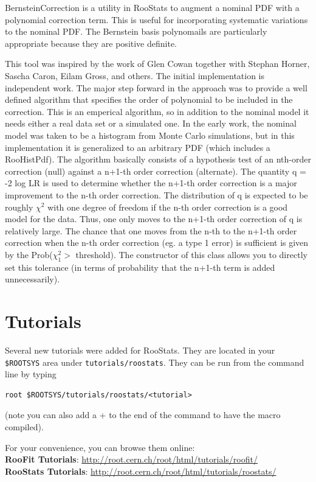\documentclass[11pt]{article}
\begin{document}
BernsteinCorrection is a utility in RooStats to augment a nominal PDF with a polynomial  correction term.  This is useful for incorporating systematic variations to the nominal PDF.   The Bernstein basis polynomails are particularly appropriate because they are positive definite. 

This tool was inspired by the work of Glen Cowan together with Stephan Horner, Sascha Caron,  Eilam Gross, and others.   The initial implementation is independent work.  The major step forward in the approach was  to provide a well defined algorithm that specifies the order of polynomial to be included  in the correction.  This is an emperical algorithm, so in addition to the nominal model it  needs either a real data set or a simulated one.  In the early work, the nominal model was taken to be a histogram from Monte Carlo simulations, but in this implementation it is generalized to an arbitrary PDF (which includes a RooHistPdf).  The algorithm basically consists of a  hypothesis test of an nth-order correction (null) against a n+1-th order correction (alternate).  The quantity q = -2 log LR is used to determine whether the n+1-th order correction is a major  improvement to the n-th order correction.  The distribution of q is expected to be roughly  $\chi^2$ with one degree of freedom if the n-th order correction is a good model for the data.   Thus, one only moves to the n+1-th order correction of q is relatively large.  The chance that  one moves from the n-th to the n+1-th order correction when the n-th order correction  (eg. a type 1 error) is sufficient is given by the Prob($\chi^2_1 >$ threshold).  The constructor  of this class allows you to directly set this tolerance (in terms of probability that the n+1-th  term is added unnecessarily).


\section{Tutorials}


Several new tutorials were added for RooStats.  They are located in your \texttt{\$ROOTSYS} area under \texttt{tutorials/roostats}.  They can be run from the command line by typing
\begin{lstlisting}[backgroundcolor=\color{shellcommand}]
root $ROOTSYS/tutorials/roostats/<tutorial>
\end{lstlisting}
%
(note you can also add a + to the end of the command to have the macro compiled).

For your convenience, you can browse them online:\\
{\bf RooFit Tutorials}: \url{http://root.cern.ch/root/html/tutorials/roofit/} \\
{\bf RooStats Tutorials}: \url{http://root.cern.ch/root/html/tutorials/roostats/} \\
\end{document}
